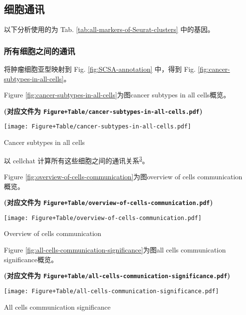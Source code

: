 \documentclass[
]{article}
\begin{document}
\hypertarget{ux7ec6ux80deux901aux8baf}{%
\subsection{细胞通讯}\label{ux7ec6ux80deux901aux8baf}}

以下分析使用的为 Tab. \ref{tab:all-markers-of-Seurat-clusters} 中的基因。

\hypertarget{ux6240ux6709ux7ec6ux80deux4e4bux95f4ux7684ux901aux8baf}{%
\subsubsection{所有细胞之间的通讯}\label{ux6240ux6709ux7ec6ux80deux4e4bux95f4ux7684ux901aux8baf}}

将肿瘤细胞亚型映射到 Fig. \ref{fig:SCSA-annotation} 中，得到 Fig. \ref{fig:cancer-subtypes-in-all-cells}。

Figure \ref{fig:cancer-subtypes-in-all-cells}为图cancer subtypes in all cells概览。

\textbf{(对应文件为 \texttt{Figure+Table/cancer-subtypes-in-all-cells.pdf})}

\def\@captype{figure}
\begin{center}
\texttt{[image: Figure+Table/cancer-subtypes-in-all-cells.pdf]}
\caption{Cancer subtypes in all cells}\label{fig:cancer-subtypes-in-all-cells}
\end{center}

以 cellchat 计算所有这些细胞之间的通讯关系\textsuperscript{\protect\hyperlink{ref-InferenceAndAJinS2021}{3}}。

Figure \ref{fig:overview-of-cells-communication}为图overview of cells communication概览。

\textbf{(对应文件为 \texttt{Figure+Table/overview-of-cells-communication.pdf})}

\def\@captype{figure}
\begin{center}
\texttt{[image: Figure+Table/overview-of-cells-communication.pdf]}
\caption{Overview of cells communication}\label{fig:overview-of-cells-communication}
\end{center}

Figure \ref{fig:all-cells-communication-significance}为图all cells communication significance概览。

\textbf{(对应文件为 \texttt{Figure+Table/all-cells-communication-significance.pdf})}

\def\@captype{figure}
\begin{center}
\texttt{[image: Figure+Table/all-cells-communication-significance.pdf]}
\caption{All cells communication significance}\label{fig:all-cells-communication-significance}
\end{center}
\end{document}
